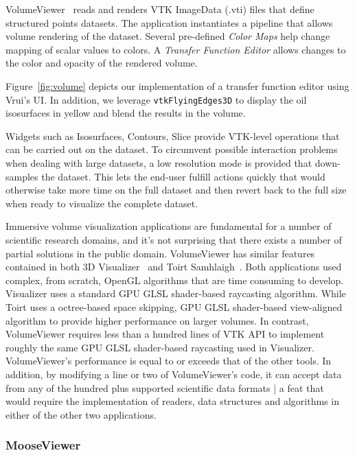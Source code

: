 VolumeViewer~\cite{VolumeViewer} reads and renders VTK ImageData (.vti) files that define structured points datasets.  The application instantiates a pipeline that allows volume rendering of the dataset. Several pre-defined \textit{Color Maps} help change mapping of scalar values to colors. A  \textit{Transfer Function Editor} allows changes to the color and opacity of the rendered volume.

Figure~\ref{fig:volume} depicts our implementation of a transfer function editor using Vrui's UI. In addition, we leverage \texttt{vtkFlyingEdges3D} to display the oil isosurfaces in yellow and blend the results in the volume.

Widgets such as Isosurfaces, Contours, Slice provide VTK-level operations that can be carried out on the dataset. To circumvent possible interaction problems when dealing with large datasets, a low resolution mode is provided that down-samples the dataset. This lets the end-user fulfill actions quickly that would otherwise take more time on the full dataset and then revert back to the full size when ready to visualize the complete dataset.

Immersive volume visualization applications are fundamental for a number of scientific research domains, and it's not surprising that there exists a number of partial solutions in the public domain. VolumeViewer has similar features contained in both 3D Visualizer~\cite{Billen:2008} and Toirt Samhlaigh~\cite{O'Leary:2008}. Both applications used complex, from scratch, OpenGL algorithms that are time consuming to develop. Visualizer uses a standard GPU GLSL shader-based raycasting algorithm. While Toirt uses a octree-based space skipping, GPU GLSL shader-based view-aligned algorithm to provide higher performance on larger volumes. In contrast, VolumeViewer requires less than a hundred lines of VTK API to implement roughly the same GPU GLSL shader-based raycasting used in Visualizer. VolumeViewer's performance is equal to or exceeds that of the other tools. In addition, by modifying a line or two of VolumeViewer's code, it can accept data from any of the hundred plus supported scientific data formats | a feat that would require the implementation of readers, data structures and algorithms in either of the other two applications.

\subsubsection{MooseViewer}

